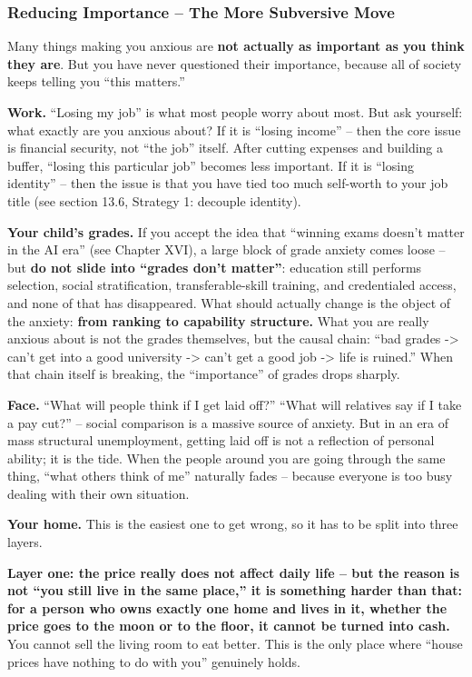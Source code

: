 \documentclass[11pt,a4paper]{article}
\begin{document}
\subsubsection{Reducing Importance -- The More Subversive Move}

Many things making you anxious are \textbf{not actually as important as you think they are}. But you have never questioned their importance, because all of society keeps telling you ``this matters.''

\textbf{Work.} ``Losing my job'' is what most people worry about most. But ask yourself: what exactly are you anxious about? If it is ``losing income'' -- then the core issue is financial security, not ``the job'' itself. After cutting expenses and building a buffer, ``losing this particular job'' becomes less important. If it is ``losing identity'' -- then the issue is that you have tied too much self-worth to your job title (see section 13.6, Strategy 1: decouple identity).

\textbf{Your child's grades.} If you accept the idea that ``winning exams doesn't matter in the AI era'' (see Chapter XVI), a large block of grade anxiety comes loose -- but \textbf{do not slide into ``grades don't matter''}: education still performs selection, social stratification, transferable-skill training, and credentialed access, and none of that has disappeared. What should actually change is the object of the anxiety: \textbf{from ranking to capability structure.} What you are really anxious about is not the grades themselves, but the causal chain: ``bad grades -> can't get into a good university -> can't get a good job -> life is ruined.'' When that chain itself is breaking, the ``importance'' of grades drops sharply.

\textbf{Face.} ``What will people think if I get laid off?'' ``What will relatives say if I take a pay cut?'' -- social comparison is a massive source of anxiety. But in an era of mass structural unemployment, getting laid off is not a reflection of personal ability; it is the tide. When the people around you are going through the same thing, ``what others think of me'' naturally fades -- because everyone is too busy dealing with their own situation.

\textbf{Your home.} This is the easiest one to get wrong, so it has to be split into three layers.

\textbf{Layer one: the price really does not affect daily life -- but the reason is not ``you still live in the same place,'' it is something harder than that: for a person who owns exactly one home and lives in it, whether the price goes to the moon or to the floor, it cannot be turned into cash.} You cannot sell the living room to eat better. This is the only place where ``house prices have nothing to do with you'' genuinely holds.
\end{document}

